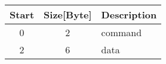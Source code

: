 	\begin{tabular}{c|c|l}
		\textbf{Start} & \textbf{Size[Byte]} & \textbf{Description} \\ \hline
		0 & 2 & command \\ 
		2 & 6 & data \\
	\end{tabular}